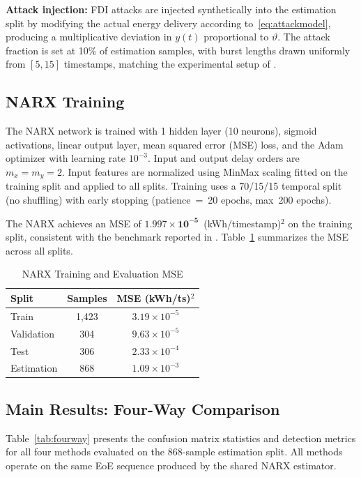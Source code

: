 \documentclass[journal]{IEEEtran}
\begin{document}
\textbf{Attack injection:} FDI attacks are injected synthetically
into the estimation split by modifying the actual energy delivery
according to~\eqref{eq:attackmodel}, producing a multiplicative
deviation in $y(t)$ proportional to $\vartheta$. The attack fraction
is set at 10\% of estimation samples, with burst lengths drawn
uniformly from $[5, 15]$ timestamps, matching the experimental setup
of \cite{basumatary2025}.

\subsection{NARX Training}

The NARX network is trained with 1 hidden layer (10 neurons), sigmoid
activations, linear output layer, mean squared error (MSE) loss,
and the Adam optimizer with learning rate $10^{-3}$. Input and output
delay orders are $m_x = m_y = 2$. Input features are normalized using
MinMax scaling fitted on the training split and applied to all splits.
Training uses a 70/15/15 temporal split (no shuffling) with early
stopping (patience~=~20 epochs, max~200 epochs).

The NARX achieves an MSE of $\mathbf{1.997 \times 10^{-5}}$~(kWh/timestamp)$^2$
on the training split, consistent with the benchmark reported in
\cite{basumatary2025}. Table~\ref{tab:narx_mse} summarizes the MSE
across all splits.

\begin{table}[!t]
\centering
\caption{NARX Training and Evaluation MSE}
\label{tab:narx_mse}
\begin{tabular}{@{}lcc@{}}
\toprule
Split & Samples & MSE (kWh/ts)$^2$ \\
\midrule
Train      & 1{,}423 & $3.19\times10^{-5}$ \\
Validation & 304     & $9.63\times10^{-5}$ \\
Test       & 306     & $2.33\times10^{-4}$ \\
Estimation & 868     & $1.09\times10^{-3}$ \\
\bottomrule
\end{tabular}
\end{table}

\subsection{Main Results: Four-Way Comparison}

Table~\ref{tab:fourway} presents the confusion matrix statistics and
detection metrics for all four methods evaluated on the 868-sample
estimation split. All methods operate on the same EoE sequence
produced by the shared NARX estimator.
\end{document}

